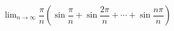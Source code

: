 \hspace*{2mm}\begin{minipage}[t]{\dimexpr\linewidth-2mm\relax}\vspace{0pt}
$\displaystyle\lim_{n\to\infty}\dfrac{\pi}{n}\left(\sin\dfrac{\pi}{n}+\sin\dfrac{2\pi}{n}+\cdots+\sin\dfrac{n\pi}{n}\right)$\end{minipage}
